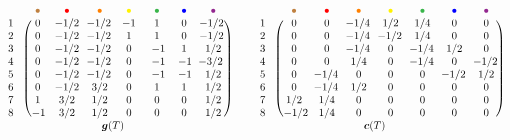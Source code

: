 \(
\begin{blockarray}{ccccccccc}
	& & {\color{brown} \bullet} & {\color{red} \bullet} & {\color{orange} \bullet} & {\color{yellow} \bullet} & {\color{green} \bullet} & {\color{blue} \bullet} & {\color{violet} \bullet} \\
	\begin{block}{c@{\hspace*{-.1cm}}c(ccccccc)}
	1 & & 0 & \! -1/2 \!\! & \!\! -1/2 \!\! & -1 & 1 & 0 & \!\! -1/2 \\
	2 & & 0 & \! -1/2 \!\! & \!\! -1/2 \!\! & 1 & 1 & 0 & \!\! -1/2 \\
	3 & & 0 & \! -1/2 \!\! & \!\! -1/2 \!\! & 0 & \; -1 \; & 1 & 1/2 \\
	4 & & 0 & \! -1/2 \!\! & \!\! -1/2 \!\! & 0 & \; -1 \; & -1\!\! & \!\!\! -3/2 \\
	5 & & 0 & \! -1/2 \!\! & \!\! -1/2 \!\! & 0 & \; -1 \; & -1 \!\! & 1/2 \\
	6 & & 0 & \! -1/2 \!\! & 3/2 & 0 & 1 & 1 & 1/2 \\
	7 & & 1 & 3/2 & 1/2 & 0 & 0 & 0 & 1/2 \\
	8 & & -1 \!\! & 3/2 & 1/2 & 0 & 0 & 0 & 1/2 \\
	\end{block}
	& & & & \multicolumn{2}{c}{$\b{g}(T)$} & &
\end{blockarray}
%
\qquad
%
\begin{blockarray}{ccccccccc}
	& & {\color{brown} \bullet} & {\color{red} \bullet} & {\color{orange} \bullet} & {\color{yellow} \bullet} & {\color{green} \bullet} & {\color{blue} \bullet} & {\color{violet} \bullet} \\
	\begin{block}{c@{\hspace*{-.1cm}}c(ccccccc)}
	1 & & 0 & 0 & \!\! -1/4 \!\! & 1/2 & 1/4 & 0 & 0 \\
	2 & & 0 & 0 & \!\! -1/4 \!\! & \!\! -1/2 \!\! & 1/4 & 0 & 0 \\
	3 & & 0 & 0 & \!\! -1/4 \!\! & 0 & \!\! -1/4 \!\! & 1/2 & 0 \\
	4 & & 0 & 0 & 1/4 & 0 & \!\! -1/4 \!\! & 0 & \!\! -1/2 \! \\
	5 & & 0 & \!\! -1/4 \!\! & 0 & 0 & 0 & \!\! -1/2 \!\! & 1/2 \\
	6 & & 0 & \!\! -1/4 \!\! & 1/2 & 0 & 0 & 0 & 0 \\
	7 & & 1/2 & 1/4 & 0 & 0 & 0 & 0 & 0 \\
	8 & & -1/2 \!\!\! & 1/4 & 0 & 0 & 0 & 0 & 0 \\
	\end{block}
	& & & & \multicolumn{2}{c}{$\b{c}(T)$} & &
\end{blockarray}
\)